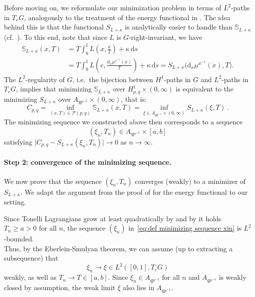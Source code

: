 \documentclass[11pt,reqno]{amsart}
\theoremstyle{plain}
\theoremstyle{definition}
\theoremstyle{plain} %
\theoremstyle{definition} %
\numberwithin{equation}{section}
\def\d{\delta}
\def\k{\kappa}
\def\d{\delta}
\def\k{\kappa}
\def\d{{\mathrm{d}}}
\begin{document}
Before moving on, we reformulate our minimization problem in terms of \( L^2 \)-paths in \( T_e G \), analogously to the treatment of the energy functional in \cite[Theorem~7.7]{Bauer_2025}. The idea behind this is that the functional \( S_{L + \kappa} \) is analytically easier to handle than \( \mathbb{S}_{L + \kappa} \) (cf.\ ). 
To this end, note that since \( L \) is \( G \)-right-invariant, we have
\begin{equation*} 
    \begin{aligned}
        \mathbb S_{L+\k}(x,T) &= T \int_0^1 L\left(x, \frac{\dot x}{T}\right)+\k \, \d s \\
        &= T \int_0^1 L\left(e, \frac{\mathrm{d}_{x} \mu^{x^{-1}} (\dot{x})}{T}\right)+\k\, \d s = S_{L + \kappa} \big( \mathrm{d}_{x} \mu^{x^{-1}} (\dot{x}), T \big).
    \end{aligned}
\end{equation*}
The \( L^2 \)-regularity of \( G \), i.e.\ the bijection between \( H^1 \)-paths in \( G \) and \( L^2 \)-paths in \( T_e G \), implies that minimizing \( \mathbb S_{L+\k} \) over \( H^1_{p,q}\times(0,\infty) \) is equivalent to the minimizing \( S_{L + \kappa} \) over \( A_{qp^{-1}} \times (0, \infty) \), that is:
\begin{equation}\label{eq: min of S and mathbb S match}
     C_{p, q} = \inf_{(x, T) \in \mathcal P(p, q)} \mathbb S_{L+\k}(x, T) =
    \inf_{\xi \in A_{qp^{-1}} \times (0, \infty)} S_{L + \kappa}(\xi, T)\, .
\end{equation}
The minimizing sequence we constructed above then corresponds to a sequence 
\begin{equation}\label{eq:def minimizing sequence xin}
    (\xi_n, T_n) \in A_{qp^{-1}} \times [a, b]
\end{equation}
satisfying \( \bigl| C_{p,q} - S_{L+\kappa}(\xi_n,T_n) \bigr| \to 0 \) as \( n \to \infty \).

\medskip

\paragraph{\textbf{Step 2: convergence of the minimizing sequence.}} We now prove that the sequence \( (\xi_n, T_n) \) converges (weakly) to a minimizer of \( S_{L+\kappa} \). 
We adapt the argument from the proof of \cite[Theorem~7.7]{Bauer_2025} for the energy functional to our setting.

Since Tonelli Lagrangians grow at least quadratically by  and  by  it holds \( T_n \geq a > 0 \) for all \( n \), the sequence \( (\xi_n) \) in~\eqref{eq:def minimizing sequence xin} is \( L^2\)-bounded. \\
Thus, by the Eberlein-Smulyan theorem, we can assume (up to extracting a subsequence) that 
\[ \xi_n \to \xi \in L^2([0, 1], T_eG)\]
weakly, as well as \( T_n \to T \in [a, b] \). Since \( \xi_n \in A_{qp^{-1}} \) for all \( n \) and \( A_{qp^{-1}} \) is weakly closed by assumption, the weak limit \( \xi \) also lies in \( A_{qp^{-1}} \).
\end{document}
